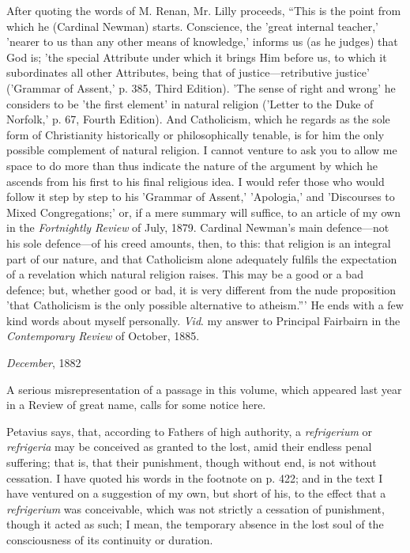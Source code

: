 After quoting the words of M. Renan, Mr. Lilly proceeds, ``This
is the point from which he (Cardinal Newman) starts. Conscience,
the 'great internal teacher,' 'nearer to us than any other means of
knowledge,' informs us (as he judges) that God is; 'the special
Attribute under which it brings Him before us, to which it
subordinates all other Attributes, being that of justice—retributive
justice' ('Grammar of Assent,' p. 385, Third Edition). 'The sense of
right and wrong' he considers to be 'the first element' in natural
religion ('Letter to the Duke of
Norfolk,' p. 67, Fourth Edition). And
Catholicism, which he regards as the sole form of Christianity
historically or philosophically tenable, is for him the only possible
complement of natural religion. I cannot venture to ask you to allow
me space to do more than thus indicate the nature of the argument by
which he ascends from his first to his final religious idea. I would
refer those who would follow it step by step to his 'Grammar of
Assent,' 'Apologia,' and 'Discourses to Mixed Congregations;' or, if a
mere summary will suffice, to an article of my own in the \emph{Fortnightly
Review} of July, 1879. Cardinal Newman's main defence—not his
sole defence—of his creed amounts, then, to this: that religion is
an integral part of our nature, and that Catholicism alone adequately
fulfils the expectation of a revelation which natural religion raises.
This may be a good or a bad defence; but, whether good or bad, it is
very different from the nude proposition 'that Catholicism is the only
possible alternative to atheism.''' He ends with a few kind words
about myself personally.
\emph{Vid}. my answer to Principal Fairbairn in the \emph{Contemporary
Review} of October, 1885.








\emph{December}, 1882

A serious misrepresentation of a passage in this volume, which
appeared last year in a Review of great name, calls for some notice
here.

Petavius says, that, according to Fathers of high authority, a \emph{refrigerium}
or \emph{refrigeria} may be conceived as granted to the lost, amid
their endless penal suffering; that is, that their punishment, though
without end, is not without cessation. I have quoted his words in the
footnote on p. 422; and in the text I have ventured on a suggestion of
my own, but short of his, to the effect that a \emph{refrigerium} was
conceivable, which was not strictly a cessation of punishment, though
it acted as such; I mean, the temporary absence in the lost soul of
the consciousness of its continuity or duration.


